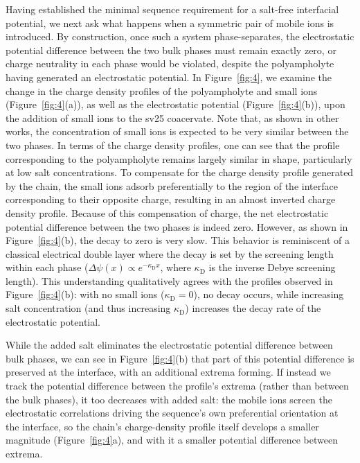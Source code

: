 \documentclass[journal=amlccd,manuscript=article,layout=twocolumn]{achemso}
\begin{document}
Having established the minimal sequence requirement for a salt-free interfacial potential, we next ask what happens when a symmetric pair of mobile ions is introduced. By construction, once such a system phase-separates, the electrostatic potential difference between the two bulk phases must remain exactly zero, or charge neutrality in each phase would be violated, despite the polyampholyte having generated an electrostatic potential. In Figure~\ref{fig:4}, we examine the change in the charge density profiles of the polyampholyte and small ions (Figure~\ref{fig:4}(a)), as well as the electrostatic potential (Figure~\ref{fig:4}(b)), upon the addition of small ions to the sv25 coacervate. Note that, as shown in other works\cite{zhangSaltingOutSaltingInPolyelectrolyte2016}, the concentration of small ions is expected to be very similar between the two phases. In terms of the charge density profiles, one can see that the profile corresponding to the polyampholyte remains largely similar in shape, particularly at low salt concentrations. To compensate for the charge density profile generated by the chain, the small ions adsorb preferentially to the region of the interface corresponding to their opposite charge, resulting in an almost inverted charge density profile. Because of this compensation of charge, the net electrostatic potential difference between the two phases is indeed zero. However, as shown in Figure~\ref{fig:4}(b), the decay to zero is very slow. This behavior is reminiscent of a classical electrical double layer \cite{gouyConstitutionChargeElectrique1910,debyeZurTheorieElektrolyte1923} where the decay is set by the screening length within each phase ($\Delta \psi(x)\propto e^{-\kappa_\mathrm{D}x}$, where $\kappa_\mathrm{D}$ is the inverse Debye screening length). This understanding qualitatively agrees with the profiles observed in Figure~\ref{fig:4}(b): with no small ions ($\kappa_\mathrm{D}=0$), no decay occurs, while increasing salt concentration (and thus increasing $\kappa_\mathrm{D}$) increases the decay rate of the electrostatic potential.

While the added salt eliminates the electrostatic potential difference between bulk phases, we can see in Figure~\ref{fig:4}(b) that part of this potential difference is preserved at the interface, with an additional extrema forming. If instead we track the potential difference between the profile's extrema (rather than between the bulk phases), it too decreases with added salt: the mobile ions screen the electrostatic correlations driving the sequence's own preferential orientation at the interface, so the chain's charge-density profile itself develops a smaller magnitude (Figure~\ref{fig:4}a), and with it a smaller potential difference between extrema.
\end{document}
